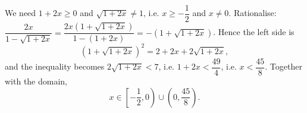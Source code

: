 We need $1+2x\ge0$ and $\sqrt{1+2x}\ne1$, i.e. $x\ge-\dfrac{1}{2}$ and $x\ne0$. Rationalise: $\dfrac{2x}{1-\sqrt{1+2x}}=\dfrac{2x\left(1+\sqrt{1+2x}\right)}{1-(1+2x)}=-\left(1+\sqrt{1+2x}\right)$. Hence the left side is
\[
\left(1+\sqrt{1+2x}\right)^2=2+2x+2\sqrt{1+2x},
\]
and the inequality becomes $2\sqrt{1+2x}<7$, i.e. $1+2x<\dfrac{49}{4}$, i.e. $x<\dfrac{45}{8}$. Together with the domain,
\[
x\in\boxed{\left[-\dfrac{1}{2},0\right)\cup\left(0,\dfrac{45}{8}\right)}.
\]
